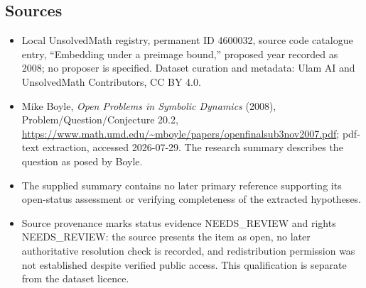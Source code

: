 \documentclass[11pt]{article}
\begin{document}
\subsection{Sources}
\begin{itemize}
\item Local UnsolvedMath registry, permanent ID 4600032, source code catalogue entry, ``Embedding under a preimage bound,'' proposed year recorded as 2008; no proposer is specified. Dataset curation and metadata: Ulam AI and UnsolvedMath Contributors, CC BY 4.0.
\item Mike Boyle, \emph{Open Problems in Symbolic Dynamics} (2008), Problem/Question/Conjecture 20.2, \url{https://www.math.umd.edu/~mboyle/papers/openfinalsub3nov2007.pdf}; pdf-text extraction, accessed 2026-07-29. The research summary describes the question as posed by Boyle.
\item The supplied summary contains no later primary reference supporting its open-status assessment or verifying completeness of the extracted hypotheses.
\item Source provenance marks status evidence NEEDS\_REVIEW and rights NEEDS\_REVIEW: the source presents the item as open, no later authoritative resolution check is recorded, and redistribution permission was not established despite verified public access. This qualification is separate from the dataset licence.
\end{itemize}
\end{document}
